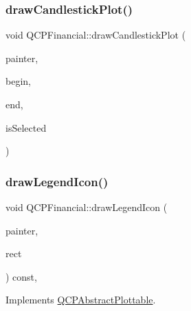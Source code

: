 \subsubsection{\texorpdfstring{draw\+Candlestick\+Plot()}{drawCandlestickPlot()}}
{\footnotesize\ttfamily void Q\+C\+P\+Financial\+::draw\+Candlestick\+Plot (\begin{DoxyParamCaption}\item[{\hyperlink{class_q_c_p_painter}{Q\+C\+P\+Painter} $\ast$}]{painter,  }\item[{const \hyperlink{class_q_c_p_data_container_ae40a91f5cb0bcac61d727427449b7d15}{Q\+C\+P\+Financial\+Data\+Container\+::const\+\_\+iterator} \&}]{begin,  }\item[{const \hyperlink{class_q_c_p_data_container_ae40a91f5cb0bcac61d727427449b7d15}{Q\+C\+P\+Financial\+Data\+Container\+::const\+\_\+iterator} \&}]{end,  }\item[{bool}]{is\+Selected }\end{DoxyParamCaption})\hspace{0.3cm}{\ttfamily [protected]}}

\mbox{\label{class_q_c_p_financial_a53f6ef2cddb650993f04c66e39a04942}} 
\subsubsection{\texorpdfstring{draw\+Legend\+Icon()}{drawLegendIcon()}}
{\footnotesize\ttfamily void Q\+C\+P\+Financial\+::draw\+Legend\+Icon (\begin{DoxyParamCaption}\item[{\hyperlink{class_q_c_p_painter}{Q\+C\+P\+Painter} $\ast$}]{painter,  }\item[{const Q\+RectF \&}]{rect }\end{DoxyParamCaption}) const\hspace{0.3cm}{\ttfamily [protected]}, {\ttfamily [virtual]}}



Implements \hyperlink{class_q_c_p_abstract_plottable_a9a450783fd9ed539e589999fd390cdf7}{Q\+C\+P\+Abstract\+Plottable}.

\mbox{\label{class_q_c_p_financial_a2c77aab636f6bce6e0407b3f94e90d08}} 
